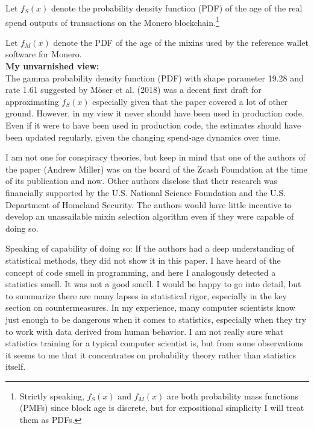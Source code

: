 \documentclass[english]{paper}
\begin{document}
Let $f_{S}(x)$ denote the probability density function (PDF) of the
age of the real spend outputs of transactions on the Monero blockchain.\footnote{Strictly speaking, $f_{S}(x)$ and $f_{M}(x)$ are both probability
mass functions (PMFs) since block age is discrete, but for expositional
simplicity I will treat them as PDFs.}

Let $f_{M}(x)$ denote the PDF of the age of the mixins used by the
reference wallet software for Monero.\\

\textbf{My unvarnished view:}\\

The gamma probability density function (PDF) with shape parameter
19.28 and rate 1.61 suggested by M{\"o}ser et al. (2018) was a decent
first draft for approximating $f_{S}(x)$ especially given that the
paper covered a lot of other ground. However, in my view it never
should have been used in production code. Even if it were to have
been used in production code, the estimates should have been updated
regularly, given the changing spend-age dynamics over time.

I am not one for conspiracy theories, but keep in mind that one of
the authors of the paper (Andrew Miller) was on the board of the Zcash
Foundation at the time of its publication and now. Other authors disclose
that their research was financially supported by the U.S. National
Science Foundation and the U.S. Department of Homeland Security. The
authors would have little incentive to develop an unassailable mixin
selection algorithm even if they were capable of doing so.

Speaking of capability of doing so: If the authors had a deep understanding
of statistical methods, they did not show it in this paper. I have
heard of the concept of \textquotedbl code smell\textquotedbl{} in
programming, and here I analogously detected a \textquotedbl statistics
smell\textquotedbl . It was not a good smell. I would be happy to
go into detail, but to summarize there are many lapses in statistical
rigor, especially in the key section on countermeasures. In my experience,
many computer scientists know \textquotedbl just enough to be dangerous\textquotedbl{}
when it comes to statistics, especially when they try to work with
data derived from human behavior. I am not really sure what statistics
training for a typical computer scientist is, but from some observations
it seems to me that it concentrates on probability theory rather than
statistics itself. 
\end{document}
